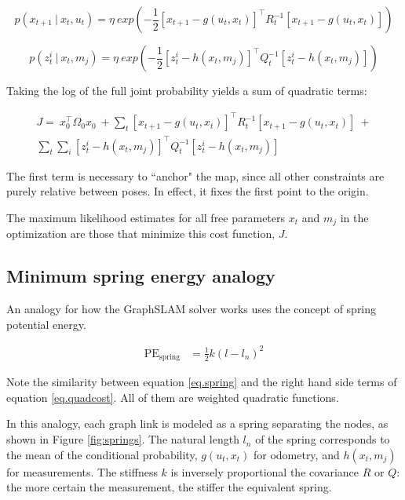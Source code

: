 \begin{equation}
p\left(x_{t+1}~|~x_t,u_t\right) = \eta~ exp\left(-\frac{1}{2}\left[x_{t+1} - g\left(u_t,x_t\right)\right]^{\intercal}R_t^{-1}\left[x_{t+1} - g\left(u_t,x_t\right)\right]\right)
\end{equation}

\begin{equation}
p\left(z^i_{t}~|~x_t,m_j\right) = \eta~ exp\left(-\frac{1}{2}\left[z^i_{t} - h\left(x_t,m_j\right)\right]^{\intercal}Q_t^{-1}\left[z^i_{t} - h\left(x_t,m_j\right)\right]\right)
\label{eq.measModel}
\end{equation}

Taking the log of the full joint probability yields a sum of quadratic terms:

\begin{multline}
J = ~x_0^{\intercal}\Omega_0 x_0 ~+
\sum_{t}{\left[x_{t+1} - g\left(u_t,x_t\right)\right]^{\intercal}R_t^{-1}\left[x_{t+1} - g\left(u_t,x_t\right)\right]} ~+ \\ \sum_{t}{\sum_{i}{\left[z^i_{t} - h\left(x_t,m_j\right)\right]^{\intercal}Q_t^{-1}\left[z^i_{t} - h\left(x_t,m_j\right)\right]}}
\label{eq.quadcost}
\end{multline}

The first term is necessary to ``anchor" the map, since all other constraints are purely relative between poses. In effect, it fixes the first point to the origin. 

The maximum likelihood estimates for all free parameters $x_t$ and $m_j$ in the optimization are those that minimize this cost function, $J$.

\subsection{Minimum spring energy analogy}

An analogy for how the GraphSLAM solver works uses the concept of spring potential energy. 

\begin{align}
\textrm{PE}_{\text{spring}} &= \frac{1}{2}k\left(l-l_n\right)^2
\label{eq.spring}
\end{align}

Note the similarity between equation \ref{eq.spring} and the right hand side terms of equation \ref{eq.quadcost}. All of them are weighted quadratic functions.

In this analogy, each graph link is modeled as a spring separating the nodes, as shown in Figure \ref{fig:springs}. The natural length $l_n$ of the spring corresponds to the mean of the conditional probability,  $g\left(u_t,x_t\right)$ for odometry, and $h\left(x_t,m_j\right)$ for measurements. The stiffness $k$ is inversely proportional the covariance $R$ or $Q$: the more certain the measurement, the stiffer the equivalent spring. 

